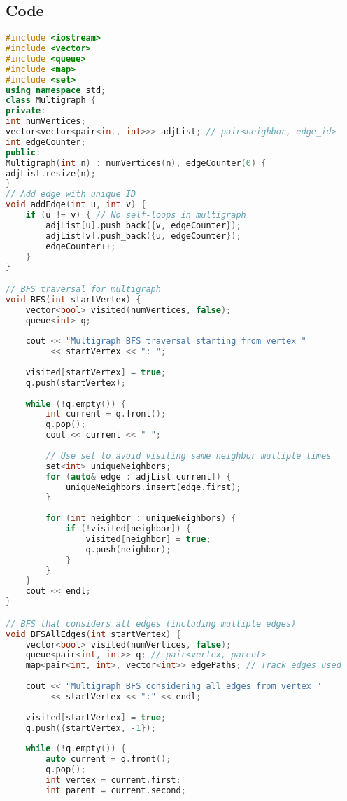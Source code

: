 \documentclass[12pt]{article}
\begin{document}
\subsection{Code}
\begin{lstlisting}[language=C++, caption=BFS cho Multigraph]
#include <iostream>
#include <vector>
#include <queue>
#include <map>
#include <set>
using namespace std;
class Multigraph {
private:
int numVertices;
vector<vector<pair<int, int>>> adjList; // pair<neighbor, edge_id>
int edgeCounter;
public:
Multigraph(int n) : numVertices(n), edgeCounter(0) {
adjList.resize(n);
}
// Add edge with unique ID
void addEdge(int u, int v) {
    if (u != v) { // No self-loops in multigraph
        adjList[u].push_back({v, edgeCounter});
        adjList[v].push_back({u, edgeCounter});
        edgeCounter++;
    }
}

// BFS traversal for multigraph
void BFS(int startVertex) {
    vector<bool> visited(numVertices, false);
    queue<int> q;
    
    cout << "Multigraph BFS traversal starting from vertex " 
         << startVertex << ": ";
    
    visited[startVertex] = true;
    q.push(startVertex);
    
    while (!q.empty()) {
        int current = q.front();
        q.pop();
        cout << current << " ";
        
        // Use set to avoid visiting same neighbor multiple times
        set<int> uniqueNeighbors;
        for (auto& edge : adjList[current]) {
            uniqueNeighbors.insert(edge.first);
        }
        
        for (int neighbor : uniqueNeighbors) {
            if (!visited[neighbor]) {
                visited[neighbor] = true;
                q.push(neighbor);
            }
        }
    }
    cout << endl;
}

// BFS that considers all edges (including multiple edges)
void BFSAllEdges(int startVertex) {
    vector<bool> visited(numVertices, false);
    queue<pair<int, int>> q; // pair<vertex, parent>
    map<pair<int, int>, vector<int>> edgePaths; // Track edges used
    
    cout << "Multigraph BFS considering all edges from vertex " 
         << startVertex << ":" << endl;
    
    visited[startVertex] = true;
    q.push({startVertex, -1});
    
    while (!q.empty()) {
        auto current = q.front();
        q.pop();
        int vertex = current.first;
        int parent = current.second;
        

\end{lstlisting}
\end{document}
